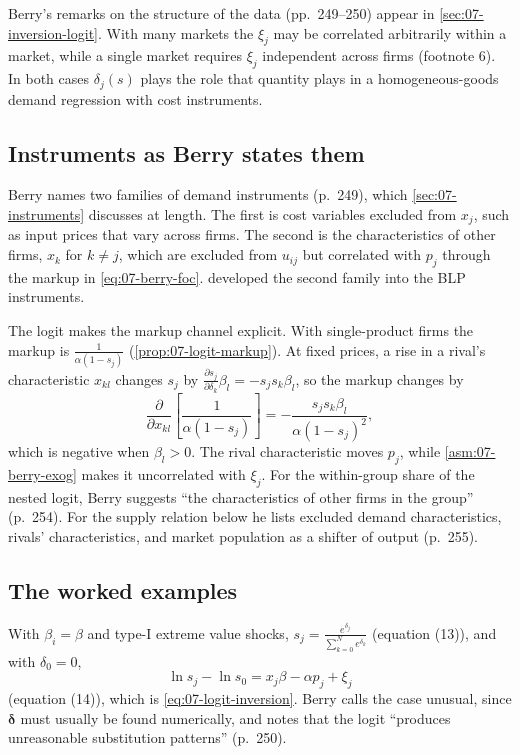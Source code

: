 Berry's remarks on the structure of the data (pp.~249--250) appear in \cref{sec:07-inversion-logit}. With many
markets the $\xi_j$ may be correlated arbitrarily within a market, while a single market requires $\xi_j$
independent across firms (footnote 6). In both cases $\delta_j(s)$ plays the role that quantity plays in a
homogeneous-goods demand regression with cost instruments.

\subsection{Instruments as Berry states them}\label{sec:07-berry-instruments}

Berry names two families of demand instruments (p.~249), which \cref{sec:07-instruments} discusses at length.
The first is cost variables excluded from $x_j$, such as input prices that vary across firms. The second is the
characteristics of other firms, $x_k$ for $k \ne j$, which are excluded from $u_{ij}$ but correlated with $p_j$
through the markup in \eqref{eq:07-berry-foc}. \citet{BerryLevinsohnPakes1995} developed the second family into
the BLP instruments.

The logit makes the markup channel explicit. With single-product firms the markup is $\frac{1}{\alpha(1-s_j)}$
(\cref{prop:07-logit-markup}). At fixed prices, a rise in a rival's characteristic $x_{kl}$ changes $s_j$ by
$\frac{\partial s_j}{\partial\delta_k}\beta_l = -s_js_k\beta_l$, so the markup changes by
\begin{equation*}
\frac{\partial}{\partial x_{kl}}\left[\frac{1}{\alpha(1-s_j)}\right] = -\frac{s_js_k\beta_l}{\alpha(1-s_j)^2},
\end{equation*}
which is negative when $\beta_l > 0$. The rival characteristic moves $p_j$, while \cref{asm:07-berry-exog} makes it
uncorrelated with $\xi_j$. For the within-group share of the nested logit, Berry suggests ``the characteristics of
other firms in the group'' (p.~254). For the supply relation below he lists excluded demand characteristics,
rivals' characteristics, and market population as a shifter of output (p.~255).

\subsection{The worked examples}\label{sec:07-berry-examples}

With $\beta_i = \beta$ and type-I extreme value shocks, $s_j = \frac{e^{\delta_j}}{\sum_{k=0}^N e^{\delta_k}}$
(equation (13)), and with $\delta_0 = 0$,
\begin{equation}\label{eq:07-berry-eq14}
\ln s_j - \ln s_0 = x_j\beta - \alpha p_j + \xi_j
\end{equation}
(equation (14)), which is \eqref{eq:07-logit-inversion}. Berry calls the case unusual, since $\boldsymbol\delta$
must usually be found numerically, and notes that the logit ``produces unreasonable substitution patterns''
(p.~250).

